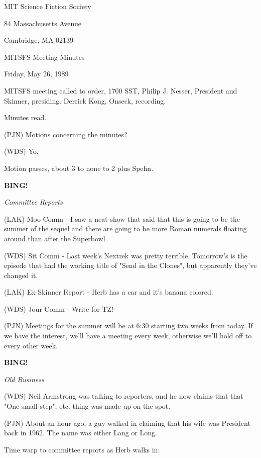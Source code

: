 \documentclass[12pt]{article}
\newcommand{\bing}{{\bf BING!} }
\newcommand{\goto}[1]{\bing \vskip 12pt \centerline{{\em{#1}}}}
\begin{document}
\begin{center}

MIT Science Fiction Society 

84 Massachusetts Avenue

Cambridge, MA 02139

\vspace{12pt}

MITSFS Meeting Minutes 

Friday, May 26, 1989

\end{center}
 
\vspace{18pt}

\setlength{\parskip}{6pt}

\noindent
MITSFS meeting called to order, 1700 SST, Philip J. Nesser, President and Skinner, presiding. Derrick Kong, Onseck, recording.

Minutes read.

(PJN) Motions concerning the minutes?

(WDS) Yo.

Motion passes, about 3 to none to 2 plus Spehn.

\goto{Committee Reports}

(LAK) Moo Comm - I saw a neat show that said that this is going to be the summer of the sequel and there are going to be more Roman numerals floating around than after the Superbowl.

(WDS) Sit Comm - Last week's Nextrek was pretty terrible.  Tomorrow's is the episode that had the working title of "Send in the Clones", but apparently they've changed it.

(LAK) Ex-Skinner Report - Herb has a car and it's banana colored.

(WDS) Jour Comm - Write for TZ!

(PJN) Meetings for the summer will be at 6:30 starting two weeks from today.  If we have the interest, we'll have a meeting every week, otherwise we'll hold off to every other week.

\goto{Old Business}

(WDS) Neil Armstrong was talking to reporters, and he now claims that that "One small step", etc. thing was made up on the spot.

(PJN) About an hour ago, a guy walked in claiming that his wife was President back in 1962.  The name was either Lang or Long.

Time warp to committee reports as Herb walks in:
\end{document}
